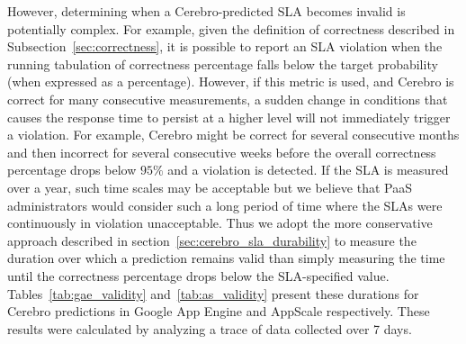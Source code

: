 
However, determining when a Cerebro-predicted SLA becomes invalid is
potentially complex. For example, given the definition of correctness
described in Subsection~\ref{sec:correctness}, it is possible to report an SLA violation
when the running tabulation of correctness percentage falls below the target
probability (when expressed as a percentage).  However, if this metric is
used, and Cerebro is correct for many consecutive measurements, a sudden
change in conditions that causes the response time to persist at a higher
level will not immediately trigger a violation.  For example, Cerebro might be
correct for several consecutive months and then incorrect for several
consecutive weeks before the overall correctness percentage drops below $95\%$
and a violation is detected.  If the SLA is measured over a year, such time
scales may be acceptable but we believe that PaaS administrators would
consider such a long period of time where the SLAs were continuously in
violation unacceptable.
Thus we adopt the more conservative approach described in 
section~\ref{sec:cerebro_sla_durability} to measure the duration over
which a prediction remains valid than simply measuring the time until the
correctness percentage drops below the SLA-specified value.
Tables~\ref{tab:gae_validity} and~\ref{tab:as_validity} present these durations
for Cerebro predictions in Google App Engine and AppScale
respectively. These results were calculated by analyzing a trace of
data collected over 7 days.

